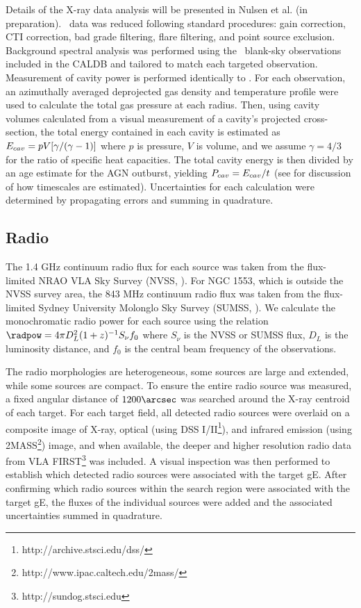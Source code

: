 \documentclass{emulateapj}
\begin{document}
Details of the X-ray data analysis will be presented in Nulsen et
al. (in preparation). \chandra\ data was reduced following standard
procedures: gain correction, CTI correction, bad grade filtering,
flare filtering, and point source exclusion. Background spectral
analysis was performed using the \caldb\ blank-sky observations
included in the CALDB and tailored to match each targeted observation.
Measurement of cavity power is performed identically to
\citet{rafferty06}. For each observation, an azimuthally averaged
deprojected gas density and temperature profile were used to calculate
the total gas pressure at each radius. Then, using cavity volumes
calculated from a visual measurement of a cavity's projected
cross-section, the total energy contained in each cavity is estimated
as $E_{cav} = pV[\gamma/(\gamma-1)]$ where $p$ is pressure, $V$ is
volume, and we assume $\gamma = 4/3$ for the ratio of specific heat
capacities. The total cavity energy is then divided by an age estimate
for the AGN outburst, yielding $P_{cav} = E_{cav}/t$ (see \citet{mcnamrev}
for discussion of how timescales are estimated). Uncertainties for
each calculation were determined by propagating errors and summing in
quadrature.

\subsection{Radio}
\label{sec:radio}

The 1.4 GHz continuum radio flux for each source was taken from the
flux-limited NRAO VLA Sky Survey (NVSS, \citealt{nvss}). For NGC 1553,
which is outside the NVSS survey area, the 843 MHz continuum radio
flux was taken from the flux-limited Sydney University Molonglo Sky
Survey (SUMSS, \citealt{sumss1, sumss2}). We calculate the
monochromatic radio power for each source using the relation $\radpow
= 4 \pi D_L^2 (1+z)^{-1} S_{\nu} f_0$ where $S_{\nu}$ is the NVSS or
SUMSS flux, $D_L$ is the luminosity distance, and $f_0$ is the central
beam frequency of the observations.

The radio morphologies are heterogeneous, some sources are large and
extended, while some sources are compact. To ensure the entire radio
source was measured, a fixed angular distance of $1200\arcsec$ was
searched around the X-ray centroid of each target. For each target
field, all detected radio sources were overlaid on a composite image
of X-ray, optical (using DSS
I/II\footnote{http://archive.stsci.edu/dss/}), and infrared emission
(using 2MASS\footnote{http://www.ipac.caltech.edu/2mass/}) image, and
when available, the deeper and higher resolution radio data from VLA
FIRST\footnote{http://sundog.stsci.edu} was included. A visual
inspection was then performed to establish which detected radio
sources were associated with the target gE. After confirming which
radio sources within the search region were associated with the target
gE, the fluxes of the individual sources were added and the associated
uncertainties summed in quadrature.
\end{document}
